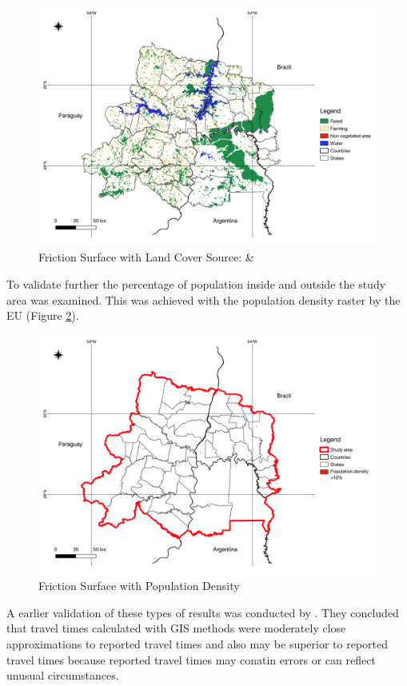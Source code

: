\documentclass[11pt, a4paper]{report}
\begin{document}
\begin{figure}[H]
  \centering
  \includegraphics[width=0.9\linewidth]{figures/Friction Surface_validation.png}
  \caption{Friction Surface with Land Cover Source: \citet{souza_reconstructing_2020} \& \citet{runfola_geoboundaries_2020}}
  \label{fig:frictionsurfacelandcover}
\end{figure}

To validate further the percentage of population inside and outside the study area was examined. This was achieved with the population density raster by the EU (Figure \ref{fig:frictionsurfacepopdens}).

\begin{figure}[H]
  \centering
  \includegraphics[width=0.9\linewidth]{figures/Friction Surface_ghsl.png}
  \caption{Friction Surface with Population Density}
  \label{fig:frictionsurfacepopdens}
\end{figure}

A earlier validation of these types of results was conducted by \cite{haynes_validation_2006}. They concluded that travel times calculated with GIS methods were moderately close approximations to reported travel times and also may be superior to reported travel times because reported travel times may conatin errors or can reflect unusual circumstances. 
\end{document}
